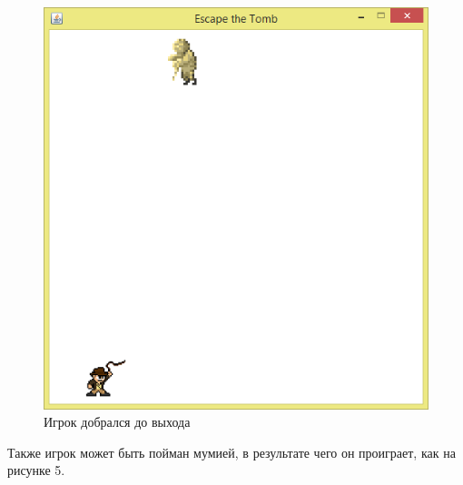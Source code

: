 \documentclass[a4paper]{article}
\begin{document}
\begin{figure}[H]
	\begin{center}
		\includegraphics[scale=0.7]{image/field3.png}
		\caption{Игрок добрался до выхода} 
		\label{pic:pic_name} %
	\end{center}
\end{figure}

Также игрок может быть пойман мумией, в результате чего он проиграет, как на рисунке 5.
\end{document}
